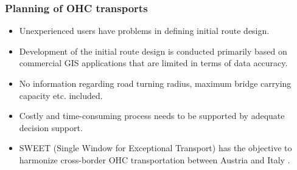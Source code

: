 \documentclass{beamer}   %
\newcommand{\RNum}[1]{\uppercase\expandafter{\romannumeral #1\relax}}
\theoremstyle{break}
\begin{document}
  \begin{frame}
    \frametitle{Planning of OHC transports  \RNum{4} }
    \begin{itemize}
      \item Unexperienced users have problems in defining initial route design.
      \item Development of the initial route design is conducted primarily based on commercial GIS applications that are limited in terms of data accuracy.
      \item No information regarding road turning radius, maximum bridge carrying capacity etc. included.
      \item Costly and time-consuming process needs to be supported by adequate decision support.
      \item SWEET (Single Window for Exceptional Transport) has the objective to harmonize cross-border OHC transportation between Austria and Italy \cite{Sweet}.
    \end{itemize}
  \end{frame}
\end{document}
